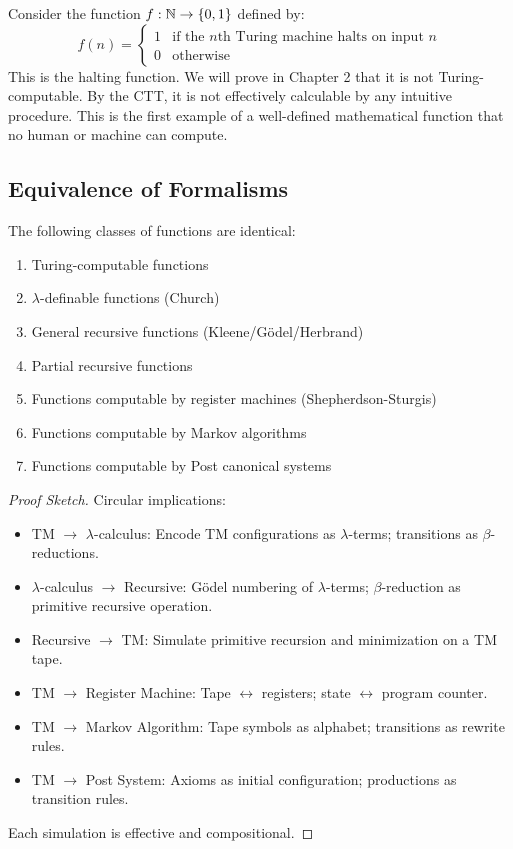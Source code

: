 \begin{example}
Consider the function $f: \mathbb{N} \to \{0,1\}$ defined by:
\[
f(n) = \begin{cases}
1 & \text{if the $n$th Turing machine halts on input $n$}\\
0 & \text{otherwise}
\end{cases}
\]
This is the halting function. We will prove in Chapter 2 that it is not Turing-computable. By the CTT, it is not effectively calculable by any intuitive procedure. This is the first example of a well-defined mathematical function that no human or machine can compute.
\end{example}

\subsection{Equivalence of Formalisms}
\label{sec:computation:equivalence}

\begin{theorem}
The following classes of functions are identical:
\begin{enumerate}
\item Turing-computable functions
\item $\lambda$-definable functions (Church)
\item General recursive functions (Kleene/G\"odel/Herbrand)
\item Partial recursive functions
\item Functions computable by register machines (Shepherdson-Sturgis)
\item Functions computable by Markov algorithms
\item Functions computable by Post canonical systems
\end{enumerate}
\end{theorem}

\begin{proof}[Proof Sketch]
Circular implications:
\begin{itemize}
\item TM $\to$ $\lambda$-calculus: Encode TM configurations as $\lambda$-terms; transitions as $\beta$-reductions.
\item $\lambda$-calculus $\to$ Recursive: G\"odel numbering of $\lambda$-terms; $\beta$-reduction as primitive recursive operation.
\item Recursive $\to$ TM: Simulate primitive recursion and minimization on a TM tape.
\item TM $\to$ Register Machine: Tape $\leftrightarrow$ registers; state $\leftrightarrow$ program counter.
\item TM $\to$ Markov Algorithm: Tape symbols as alphabet; transitions as rewrite rules.
\item TM $\to$ Post System: Axioms as initial configuration; productions as transition rules.
\end{itemize}
Each simulation is effective and compositional.
\end{proof}

